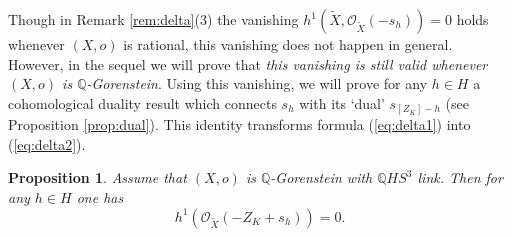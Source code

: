 \documentclass[12pt,a4paper]{amsart}
\def\Q{\mathbb{Q}}
\def\cO{\mathcal{O}}
\newtheorem{prop}{Proposition}[section]
\theoremstyle{remark}
\theoremstyle{definition}
\begin{document}
Though in Remark \ref{rem:delta}(3)  the vanishing $h^1(\tilde X,\cO_{\tilde X}(-s_h))=0$ holds whenever $(X,o)$ is rational, this vanishing does  not happen  in general. However, in the sequel we will prove   that {\it this  vanishing is still valid whenever  $(X,o)$ is $\Q$-Gorenstein}.
Using this vanishing, we will prove for any $h\in H$ a cohomological duality result which connects $s_h$ with its `dual' $s_{[Z_K]-h}$ (see Proposition \ref{prop:dual}). This identity 
transforms formula (\ref{eq:delta1}) into  (\ref{eq:delta2}). 

\begin{prop}\label{thm:h1} Assume that $(X,o)$ is $\Q$-Gorenstein with $\Q HS^3$ link. Then for any $h\in H$ one has
\begin{equation}\label{eq:h1}
h^1(\cO_{{\tilde X}}(-Z_K+s_h))=0.
\end{equation}
\end{prop}
\end{document}
